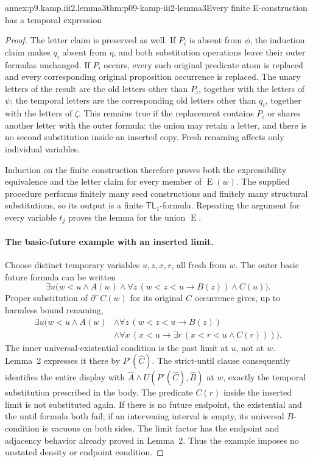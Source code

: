 \begin{annexitem}{annex:p9.kamp.iii2.lemma3}{thm:p09-kamp-iii2-lemma3}{Every finite E-construction has a temporal expression}
\begin{proof}
The letter claim is preserved as well. If \(P_i\) is absent from
\(\phi\), the induction claim makes \(q_i\) absent from
\(\eta\), and both substitution operations leave their outer
formulas unchanged. If \(P_i\) occurs, every such original predicate
atom is replaced and every corresponding original proposition occurrence
is replaced. The unary letters of the result are the old letters other
than \(P_i\), together with the letters of \(\psi\); the temporal
letters are the corresponding old letters other than \(q_i\), together
with the letters of \(\zeta\). This remains true if the replacement
contains \(P_i\) or shares another letter with the outer formula:
the union may retain a letter, and there is no second substitution inside
an inserted copy. Fresh renaming affects only individual variables.

Induction on the finite construction therefore proves both the
expressibility equivalence and the letter claim for every member of
\(\operatorname{E}(w)\). The supplied procedure performs finitely
many seed constructions and finitely many structural substitutions, so
its output is a finite \(\mathsf{TL}_1\)-formula. Repeating the
argument for every variable \(t_j\) proves the lemma for the union
\(\operatorname{E}\).

\paragraph{The basic-future example with an inserted limit.}
Choose distinct temporary variables \(u,z,x,r\), all fresh from
\(w\). The outer basic future formula can be written
\[
 \exists u\bigl(w<u\land A(w)
   \land\forall z\,(w<z<u\to B(z))\land C(u)\bigr).
\]
Proper substitution of \(\partial^-C(w)\) for its original \(C\)
occurrence gives, up to harmless bound renaming,
\[
\begin{split}
 \exists u\bigl(w<u\land A(w)
   &\land\forall z\,(w<z<u\to B(z))\\
   &\land\forall x\,(x<u\to
            \exists r\,(x<r<u\land C(r)))\bigr).
\end{split}
\]
The inner universal-existential condition is the past limit at \(u\),
not at \(w\). Lemma~2 expresses it there by \(P'(\widehat C)\).
The strict-until clause consequently identifies the entire display with
\(\widehat A\land U(P'(\widehat C),\widehat B)\) at \(w\),
exactly the temporal substitution prescribed in the body. The predicate
\(C(r)\) inside the inserted limit is not substituted again. If there
is no future endpoint, the existential and the until formula both fail;
if an intervening interval is empty, its universal \(B\)-condition is
vacuous on both sides. The limit factor has the endpoint and adjacency
behavior already proved in Lemma~2. Thus the example imposes no unstated
density or endpoint condition.


\end{proof}
\end{annexitem}
